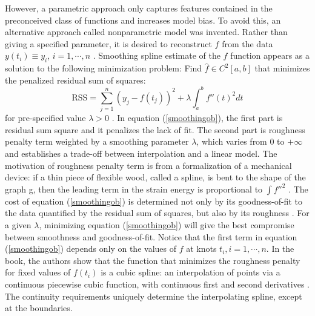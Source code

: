 However, a parametric approach only captures features contained in the preconceived class of functions \cite{yao2005functional} and increases model bias. To avoid this, an alternative approach called nonparametric model was invented. Rather than giving a specified parameter, it is desired to reconstruct $f$ from the data $y(t_i)\equiv y_i$, $i=1, \cdots, n$ \cite{craven1978smoothing}. Smoothing spline estimate of the $f$ function appears as a solution to the following minimization problem: Find $\hat{f} \in \mathit{C}^2[a,b]$ that minimizes the penalized residual sum of squares:
\begin{equation}\label{smoothingob}
\mbox{RSS}=\sum_{j=1}^{n}(y_j-f(t_j))^2+\lambda\int_{a}^{b} f''(t)^2dt
\end{equation}
for pre-specified value $\lambda>0$ \cite{aydin2012smoothing}. In equation (\ref{smoothingob}), the first part is residual sum square and it penalizes the lack of fit. The second part is roughness penalty term weighted by a smoothing parameter $\lambda$, which varies from 0 to $+\infty$ and establishes a trade-off between interpolation and a linear model. The motivation of roughness penalty term is from a formalization of a mechanical device: if a thin piece of flexible wood, called a spline, is bent to the shape of the graph g, then the leading term in the strain energy is proportional to $\int f''^2$ \cite{green1993nonparametric}. The cost of equation (\ref{smoothingob}) is determined not only by its goodness-of-fit to the data quantified by the residual sum of squares, but also by its roughness \cite{schwarz2012geodesy}. For a given $\lambda$, minimizing equation (\ref{smoothingob}) will give the best compromise between smoothness and goodness-of-fit. Notice that the first term in equation (\ref{smoothingob}) depends only on the values of $f$ at knots $t_i, i=1, \cdots, n$. In the book, the authors show that the function that minimizes the roughness penalty for fixed values of $f(t_i)$ is a cubic spline: an interpolation of points via a continuous piecewise cubic function, with continuous first and second derivatives \cite{green1993nonparametric}. The continuity requirements uniquely determine the interpolating spline, except at the boundaries\cite{sealfon2005smoothing}.


%

